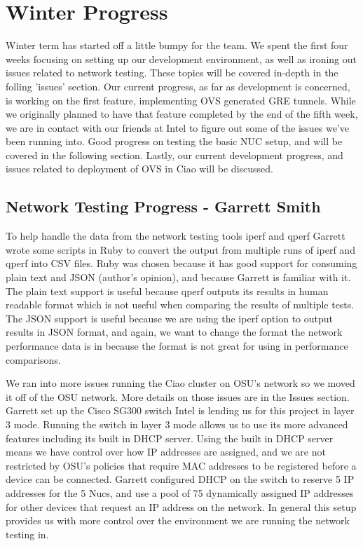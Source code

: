 \documentclass[10pt,onecolumn,journal,draftclsnofoot]{IEEEtran}
\begin{document}
\section{Winter Progress}
Winter term has started off a little bumpy for the team. We spent the first four
weeks focusing on setting up our development environment, as well as ironing out
issues related to network testing. These topics will be covered in-depth in the
folling 'issues' section. Our current progress, as far as development is
concerned, is working on the first feature, implementing OVS generated GRE
tunnels. While we originally planned to have that feature completed by the end
of the fifth week, we are in contact with our friends at Intel to figure out
some of the issues we've been running into. Good progress on testing the basic
NUC setup, and will be covered in the following section. Lastly, our current
development progress, and issues related to deployment of OVS in Ciao will be
discussed.

\subsection{Network Testing Progress - Garrett Smith}
To help handle the data from the network testing tools iperf and qperf Garrett
wrote some scripts in Ruby to convert the output from multiple runs of iperf and
qperf into CSV files. Ruby was chosen because it has good support for consuming
plain text and JSON (author's opinion), and because Garrett is familiar with it.
The plain text support is useful because qperf outputs its results in human
readable format which is not useful when comparing the results of multiple
tests.  The JSON support is useful because we are using the iperf option to
output results in JSON format, and again, we want to change the format the
network performance data is in because the format is not great for using in
performance comparisons.

We ran into more issues running the Ciao cluster on OSU's network so we moved it
off of the OSU network. More details on those issues are in the Issues section.
Garrett set up the Cisco SG300 switch Intel is lending us for this project in
layer 3 mode. Running the switch in layer 3 mode allows us to use its more
advanced features including its built in DHCP server. Using the built in DHCP
server means we have control over how IP addresses are assigned, and we are not
restricted by OSU's policies that require MAC addresses to be registered before
a device can be connected.
Garrett configured DHCP on the switch to reserve 5 IP addresses for the
5 Nucs, and use a pool of 75 dynamically assigned IP addresses for other
devices that request an IP address on the network. In general this setup
provides us with more control over the environment we are running the network
testing in.
\end{document}
